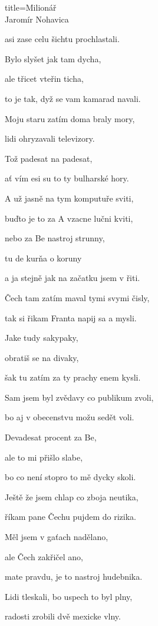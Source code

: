 \begin{song}{title=\centering Milionář \\\normalsize Jaromír Nohavica  \vspace*{-0.3cm}}
{\begin{minipage}[t]{0.48\textwidth}
asi zase celu šichtu prochlastali.

Bylo slyšet jak tam dycha, 

ale třicet vteřin ticha, 

to je tak, dyž se vam kamarad navali.

\sloka
Moju staru zatím doma braly mory,

lidi ohryzavali televizory.



\end{minipage}\begin{minipage}[t]{0.5\textwidth}\setlength{\parindent}{0.45cm}\vspace*{1.07cm}  %

Tož padesat na padesat, 

ať vím esi su to ty bulharské hory.

\sloka
A už jasně na tym komputuře sviti, 

buďto je to za A vzacne lučni kviti, 

nebo za Be nastroj strunny, 

tu de kurňa o koruny 

a ja stejně jak na začatku jsem v řiti.

\sloka
Čech tam zatím maval tymi svymi čisly,

tak si řikam Franta napij sa a mysli. 

Jake tudy sakypaky, 

obratiš se na divaky,

šak tu zatím za ty prachy enem kysli. 

\sloka
Sam jsem byl zvědavy co publikum zvoli, 

bo aj v obecenstvu možu sedět voli. 

Devadesat procent za Be, 

ale to mi přišlo slabe, 

bo co není stopro to mě dycky skoli. 

\sloka
Ještě že jsem chlap co zboja neutika, 

říkam pane Čechu pujdem do rizika. 

Měl jsem v gaťach nadělano, 

ale Čech zakřičel ano, 

mate pravdu, je to nastroj hudebnika.

\sloka 
Lidi tleskali, bo uspech to byl plny, 

radosti zrobili dvě mexicke vlny. 


\end{minipage}}
\end{song}
